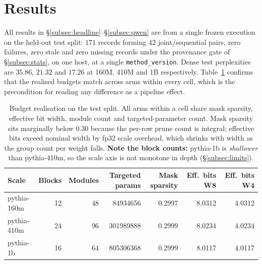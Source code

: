 %
%

\section{Results}
\label{sec:results}

All results in \S\ref{subsec:headline}--\S\ref{subsec:qwen} are from a single frozen
execution on the held-out test split: $171$ records forming $42$ joint/sequential pairs,
zero failures, zero stale and zero missing records under the provenance gate of
\S\ref{subsec:stats}, on one host, at a single \texttt{method\_version}. Dense test
perplexities are $35.86$, $21.32$ and $17.26$ at 160M, 410M and 1B respectively.
Table~\ref{tab:budget} confirms that the realised budgets match across arms within every
cell, which is the precondition for reading any difference as a pipeline effect.

\begin{table}[t]
\centering
\caption{Budget realisation on the test split. All arms within a cell share mask sparsity,
effective bit width, module count and targeted-parameter count. Mask sparsity sits marginally
below $0.30$ because the per-row prune count is integral; effective bits exceed nominal width
by fp32 scale overhead, which shrinks with width as the group count per weight falls.
\textbf{Note the block counts:} pythia-1b is \emph{shallower} than pythia-410m, so the scale
axis is not monotone in depth (\S\ref{subsec:limits}).}
\label{tab:budget}
\small
\begin{tabular}{@{}lrrrrrr@{}}
\toprule
\textbf{Scale} & \textbf{Blocks} & \textbf{Modules} & \textbf{Targeted params} &
\textbf{Mask sparsity} & \textbf{Eff.\ bits W8} & \textbf{Eff.\ bits W4} \\
\midrule
pythia-160m & 12 & 48 & \num{84934656}  & 0.2997 & 8.0312 & 4.0312 \\
pythia-410m & 24 & 96 & \num{301989888} & 0.2999 & 8.0234 & 4.0234 \\
pythia-1b   & 16 & 64 & \num{805306368} & 0.2999 & 8.0117 & 4.0117 \\
\bottomrule
\end{tabular}
\end{table}

